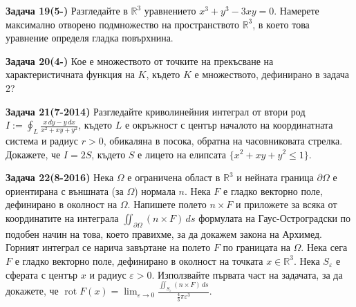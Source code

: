 \documentclass[10pt]{article}
\begin{document}
\textbf{Задача 19(5-) }Разгледайте в $\mathbb{R}^3$ уравнението $x^3 + y^3 - 3xy = 0$. Намерете максимално отворено подмножество на пространството $\mathbb{R}^3$, в което това уравнение определя гладка повърхнина.

\textbf{Задача 20(4-) }Кое е множеството от точките на прекъсване на характеристичната функция на $K$, където $K$ е множеството, дефинирано в задача 2?

\textbf{Задача 21(7-2014)} Разгледайте криволинейния интеграл от втори род $I := \oint_L \frac{x\,dy - y\,dx}{x^2+xy+y^2}$, където $L$ е окръжност с център началото на координатната система и радиус $r > 0$, обикаляна в посока, обратна на часовниковата стрелка. Докажете, че $I = 2S$, където $S$ е лицето на елипсата $\{x^2+xy+y^2 \le 1\}$.

\textbf{Задача 22(8-2016)} Нека $\Omega$ е ограничена област в $\mathbb{R}^3$ и нейната граница $\partial\Omega$ е ориентирана с външната (за $\Omega$) нормала $n$. Нека $F$ е гладко векторно поле, дефинирано в околност на $\Omega$. Напишете полето $n \times F$ и приложете за всяка от координатите на интеграла $\iint_{\partial\Omega} (n \times F) \,ds$ формулата на Гаус-Остроградски по подобен начин на това, което правихме, за да докажем закона на Архимед. Горният интеграл се нарича завъртане на полето $F$ по границата на $\Omega$. Нека сега $F$ е гладко векторно поле, дефинирано в околност на точката $x \in \mathbb{R}^3$. Нека $S_\varepsilon$ е сферата с център $x$ и радиус $\varepsilon > 0$. Използвайте първата част на задачата, за да докажете, че $\operatorname{rot} F(x) = \displaystyle \lim_{\varepsilon\to 0} \frac{\iint_{S_\varepsilon} (n \times F) \,ds}{\frac{4}{3}\pi \varepsilon^3}$.
\end{document}
